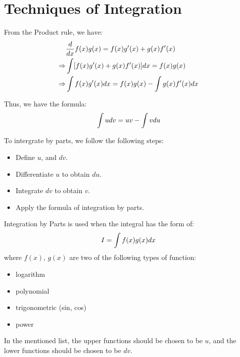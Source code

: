 \chapter{Techniques of Integration}
    
        \par From the Product rule, we have:
        \begin{align*}
            &\frac{d}{dx}f(x)g(x) = f(x)g'(x) + g(x)f'(x) \\
            \Rightarrow & \int\limits [f(x)g'(x) + g(x)f'(x)]dx = f(x)g(x) \\
            \Rightarrow & \int\limits f(x)g'(x)dx = f(x)g(x) - \int\limits g(x)f'(x)dx \\
        \end{align*}
        \par Thus, we have the formula:
        \begin{equation}
            \int\limits udv = uv - \int\limits vdu
        \end{equation}

        \par To intergrate by parts, we follow the following steps:
        \begin{itemize}
            \item Define $u$, and $dv$.
            \item Differentiate $u$ to obtain $du$.
            \item Integrate $dv$ to obtain $v$.
            \item Apply the formula of integration by parts.
        \end{itemize}

        \par Integration by Parts is used when the integral has the form of:
        \begin{align*}
            I = \int\limits f(x)g(x)dx
        \end{align*}
        where $f(x)$, $g(x)$ are two of the following types of function:
        \begin{itemize}
            \item logarithm
            \item polynomial
            \item trigonometric (sin, cos)
            \item power
        \end{itemize}
        \par In the mentioned list, the upper functions should be chosen to be $u$, and the
        lower functions should be chosen to be $dv$.

